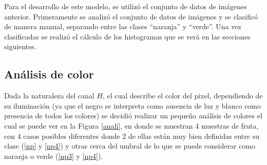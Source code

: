\documentclass[twoside,spanish,ESP,MSc]{plantillaLabUPV}
\theoremstyle{definition}
\begin{document}
Para el desarrollo de este modelo, se utilizó el conjunto de datos de imágenes anterior. Primeramente se analizó el conjunto de datos de imágenes y se clasificó de manera manual, separando entre las clases ``naranja'' y ``verde''. Una vez clasificadas se realizó el cálculo de los histogramas que se verá en las secciones siguientes.


\subsection{Análisis de color}

Dada la naturaleza del canal $H$, el cual describe el color del pixel, dependiendo de su iluminación (ya que el negro se interpreta como ausencia de luz y blanco como presencia de todos los colores) se decidió realizar un pequeño análisis de colores el cual se puede ver en la Figura \ref{anali}, en donde se muestran 4 muestras de fruta, con 4 casos posibles diferentes donde 2 de ellas están muy bien definidas entre su clase (\ref{np} y \ref{np4}) y otras cerca del umbral de lo que se puede considerar como naranja o verde (\ref{np3} y \ref{np4}).
\end{document}

